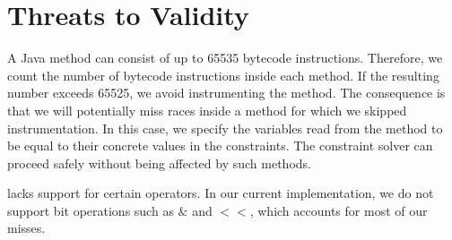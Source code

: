 \section{Threats to Validity}
A Java method can consist of up to 65535 bytecode instructions. Therefore,
 we count the number of bytecode instructions inside each method. If the 
resulting number exceeds 65525, we avoid instrumenting the method. 
The consequence is that we will potentially miss races inside a method for 
which we skipped instrumentation. In this case, we specify the variables 
read from the method to be equal to their concrete values in the constraints. 
The constraint solver can proceed safely without being affected by 
such methods.

\tool lacks support for certain operators. In our current 
implementation, we do not support bit operations such as $\&$ and $<<$, which accounts for most of our misses.



